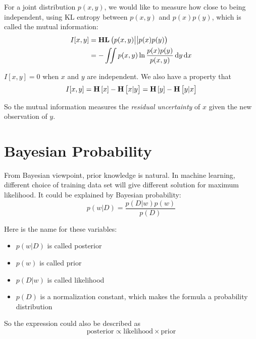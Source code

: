 \begin{definition}
    For a joint distribution $p(x,y)$, we would like to measure how close to being independent, using KL entropy between $p(x,y)$ and $p(x)p(y)$, which is called the mutual information:
    \begin{equation}
        \begin{aligned}
            I[x,y] &= \kldivergence{p(x,y)}{p(x)p(y)} \\
            &= -\iint p(x,y) \ln \frac{p(x)p(y)}{p(x,y)} \dif y \dif x
        \end{aligned}
    \end{equation}
    
    $I[x,y] = 0$ when $x$ and $y$ are independent. We also have a property that
    \begin{equation}
        I[x,y] = \mathop{\bf H\/}\left[\displaystyle x \right] - \mathop{\bf H\/}\left[\displaystyle x|y \right] = \mathop{\bf H\/}\left[\displaystyle y \right] - \mathop{\bf H\/}\left[\displaystyle y|x \right]
    \end{equation}
    
    So the mutual information measures the \emph{residual uncertainty} of $x$ given the new observation of $y$.
\end{definition}




\section{Bayesian Probability}

From Bayesian viewpoint, prior knowledge is natural. In machine learning, different choice of training data set will give different solution for maximum likelihood. It could be explained by Bayesian probability:
\begin{equation}\label{bayesian_posterior}
    p(w|D) = \frac{p(D|w)p(w)}{p(D)}
\end{equation}

Here is the name for these variables:
\begin{itemize}
    \item $p(w|D)$ is called posterior
    \item $p(w)$ is called prior
    \item $p(D|w)$ is called likelihood
    \item $p(D)$ is a normalization constant, which makes the formula a probability distribution
\end{itemize}

So the expression could also be described as
\begin{equation}
    \text{posterior} \propto \text{likelihood} \times \text{prior}
\end{equation}


